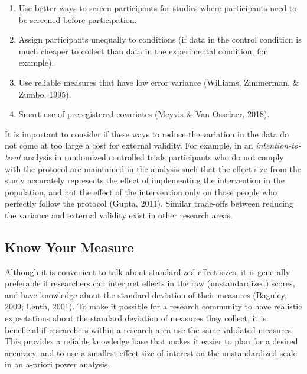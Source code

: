 \documentclass[
  english,
  ,jou,floatsintext]{apa6}
\providecommand{\tightlist}{%
  \setlength{\itemsep}{0pt}\setlength{\parskip}{0pt}}
\begin{document}
\begin{enumerate}
\def\labelenumi{\arabic{enumi}.}
\tightlist
\item
  Use better ways to screen participants for studies where participants need to be screened before participation.
\item
  Assign participants unequally to conditions (if data in the control condition is much cheaper to collect than data in the experimental condition, for example).
\item
  Use reliable measures that have low error variance (Williams, Zimmerman, \& Zumbo, 1995).
\item
  Smart use of preregistered covariates (Meyvis \& Van Osselaer, 2018).
\end{enumerate}

It is important to consider if these ways to reduce the variation in the data do not come at too large a cost for external validity. For example, in an \emph{intention-to-treat} analysis in randomized controlled trials participants who do not comply with the protocol are maintained in the analysis such that the effect size from the study accurately represents the effect of implementing the intervention in the population, and not the effect of the intervention only on those people who perfectly follow the protocol (Gupta, 2011). Similar trade-offs between reducing the variance and external validity exist in other research areas.

\hypertarget{know-your-measure}{%
\subsection{Know Your Measure}\label{know-your-measure}}

Although it is convenient to talk about standardized effect sizes, it is generally preferable if researchers can interpret effects in the raw (unstandardized) scores, and have knowledge about the standard deviation of their measures (Baguley, 2009; Lenth, 2001). To make it possible for a research community to have realistic expectations about the standard deviation of measures they collect, it is beneficial if researchers within a research area use the same validated measures. This provides a reliable knowledge base that makes it easier to plan for a desired accuracy, and to use a smallest effect size of interest on the unstandardized scale in an a-priori power analysis.
\end{document}
